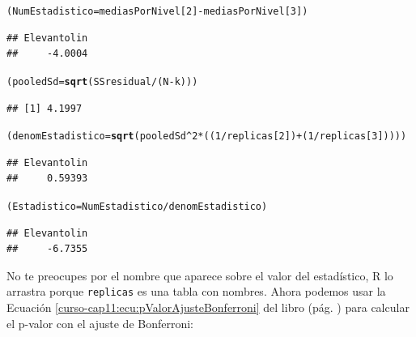 \documentclass[10pt,a4paper]{article}\usepackage[]{graphicx}\usepackage[]{color}
\makeatletter
\newcommand{\hlnum}[1]{\textcolor[rgb]{0.686,0.059,0.569}{#1}}%
\newcommand{\hlopt}[1]{\textcolor[rgb]{0,0,0}{#1}}%
\newcommand{\hlstd}[1]{\textcolor[rgb]{0.345,0.345,0.345}{#1}}%
\newcommand{\hlkwb}[1]{\textcolor[rgb]{0.69,0.353,0.396}{#1}}%
\newcommand{\hlkwd}[1]{\textcolor[rgb]{0.737,0.353,0.396}{\textbf{#1}}}%
\newenvironment{kframe}{%
 \def\at@end@of@kframe{}%
 \ifinner\ifhmode%
  \def\at@end@of@kframe{\end{minipage}}%
  \begin{minipage}{\columnwidth}%
 \fi\fi%
 \def\FrameCommand##1{\hskip\@totalleftmargin \hskip-\fboxsep
 \colorbox{shadecolor}{##1}\hskip-\fboxsep
     \hskip-\linewidth \hskip-\@totalleftmargin \hskip\columnwidth}%
 \MakeFramed {\advance\hsize-\width
   \@totalleftmargin\z@ \linewidth\hsize
   \@setminipage}}%
 {\par\unskip\endMakeFramed%
 \at@end@of@kframe}
\newenvironment{knitrout}{}{} %
\makeatother
\begin{document}
\begin{knitrout}
\color{fgcolor}\begin{kframe}
\begin{alltt}
\hlstd{(NumEstadistico} \hlkwb{=} \hlstd{mediasPorNivel[}\hlnum{2}\hlstd{]} \hlopt{-} \hlstd{mediasPorNivel[}\hlnum{3}\hlstd{]  )}
\end{alltt}
\begin{verbatim}
## Elevantolin 
##     -4.0004
\end{verbatim}
\begin{alltt}
\hlstd{(pooledSd} \hlkwb{=} \hlkwd{sqrt}\hlstd{(SSresidual}\hlopt{/}\hlstd{(N}\hlopt{-}\hlstd{k)))}
\end{alltt}
\begin{verbatim}
## [1] 4.1997
\end{verbatim}
\begin{alltt}
\hlstd{(denomEstadistico} \hlkwb{=} \hlkwd{sqrt}\hlstd{(pooledSd}\hlopt{^}\hlnum{2} \hlopt{*} \hlstd{((}\hlnum{1} \hlopt{/} \hlstd{replicas[}\hlnum{2}\hlstd{])} \hlopt{+} \hlstd{(}\hlnum{1} \hlopt{/} \hlstd{replicas[}\hlnum{3}\hlstd{]))))}
\end{alltt}
\begin{verbatim}
## Elevantolin 
##     0.59393
\end{verbatim}
\begin{alltt}
\hlstd{(Estadistico} \hlkwb{=} \hlstd{NumEstadistico} \hlopt{/} \hlstd{denomEstadistico)}
\end{alltt}
\begin{verbatim}
## Elevantolin 
##     -6.7355
\end{verbatim}
\end{kframe}
\end{knitrout}
No te preocupes por el nombre que aparece sobre el valor del estadístico, R lo arrastra porque {\tt replicas} es una tabla con nombres. Ahora podemos usar la Ecuación \ref{curso-cap11:ecu:pValorAjusteBonferroni} del libro (pág. \pageref{curso-cap11:ecu:pValorAjusteBonferroni}) para calcular el p-valor con el ajuste de Bonferroni:
\end{document}
